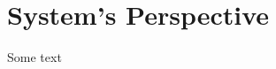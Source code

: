 \documentclass[main.tex]{subfiles}
\begin{document}
    \section{System's Perspective}
    \label{Sec:systems_perspective}
        Some text    
\end{document}
